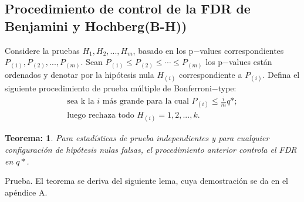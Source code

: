 \documentclass[11pt,letterpaper]{article}
\newtheorem{thmt}{Teorema:}
\begin{document}
\subsection{Procedimiento de control de la FDR de Benjamini y Hochberg(B-H))}
Considere la pruebas $H_1, H_2, ..., H_m$, basado en los p$-$values correspondientes $P_{(1)}, P_{(2)},..., P_{(m)}$. Sean $P_{(1)}\leq P_{(2)}\leq \cdots \leq  P_{(m)}$ los p$-$values están ordenados y denotar por la hipótesis nula $H_{(i)}$ correspondiente a $P_{(i)}$. Defina el siguiente procedimiento de prueba múltiple de Bonferroni$-$type:\\
\begin{align*}
  \text{sea k la $i$ más grande para la cual }P_{(i)}\leq \frac{i}{m}q*;\\
 \text{luego rechaza todo }H_{(i)} = 1, 2, ..., k.
\end{align*} 

\begin{framed}
    \begin{thmt} \label{t_1}
Para estadísticas de prueba independientes y para cualquier configuración de hipótesis nulas falsas, el procedimiento anterior controla el FDR en $q*$.
    \end{thmt}
\end{framed}
Prueba. El teorema se deriva del siguiente lema, cuya demostración se da en el apéndice A.
\end{document}
